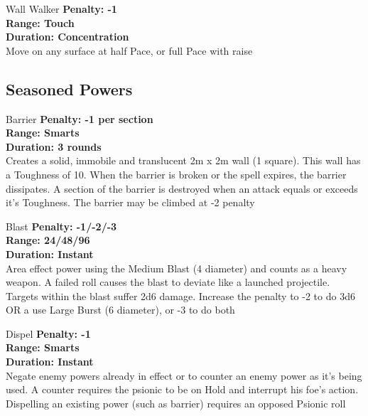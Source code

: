 \begin{multicols}{2}
\begin{genericsection}{Wall Walker}
\textbf{Penalty: -1}\\
\textbf{Range: Touch}\\
\textbf{Duration: Concentration}\\
Move on any surface at half Pace, or full Pace with raise
\end{genericsection}

\subsection{Seasoned Powers}

\begin{genericsection}{Barrier}
\textbf{Penalty: -1 per section}\\
\textbf{Range: Smarts}\\
\textbf{Duration: 3 rounds}\\
Creates a solid, immobile and translucent 2m x 2m wall (1 square). This wall has a Toughness of 10. When the barrier is broken or the spell expires, the barrier dissipates. A section of the barrier is destroyed when an attack equals or exceeds it's Toughness. The barrier may be climbed at -2 penalty
\end{genericsection}

\begin{genericsection}{Blast}
\textbf{Penalty: -1/-2/-3}\\
\textbf{Range: 24/48/96}\\
\textbf{Duration: Instant}\\
Area effect power using the Medium Blast (4 diameter) and counts as a heavy weapon. A failed roll causes the blast to deviate like a launched projectile. Targets within the blast suffer 2d6 damage. Increase the penalty to -2 to do 3d6 OR a use Large Burst (6 diameter), or -3 to do both
\end{genericsection}

\begin{genericsection}{Dispel}
\textbf{Penalty: -1}\\
\textbf{Range: Smarts}\\
\textbf{Duration: Instant}\\
Negate enemy powers already in effect or to counter an enemy power as it's being used. A counter requires the psionic to be on Hold and interrupt his foe's action. Dispelling an existing power (such as barrier) requires an opposed Psionic roll
\end{genericsection}


\end{multicols}
